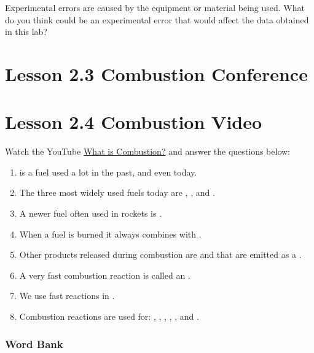 \documentclass[answers,12pt]{exam}
\begin{document}
\begin{questions}
    \question Experimental errors are caused by the equipment or material being used.  What do you think could be an experimental error that would affect the data obtained in this lab?

    \vspace{2cm}
\end{questions}

\newpage

\section*{Lesson 2.3 Combustion Conference}

\newpage

\section*{Lesson 2.4 Combustion Video}

Watch the YouTube \href{https://www.youtube.com/watch?v=xd1alir07q4}{What is Combustion?} and answer the questions below:


\begin{enumerate}
    \item  \fillin[wood] is a fuel used a lot in the past, and even today.
    \item  The three most widely used fuels today are \fillin[coal], \fillin[oil], and .
    \item  A newer fuel often used in rockets is \fillin[hydrogen].
    \item  When a fuel is burned it always combines with \fillin[oxygen].
    \item  Other products released during combustion are  and \fillin[water] that are emitted as a \fillin[gas].
    \item  A very fast combustion reaction is called an \fillin[explosion].
    \item  We use fast reactions in .
    \item  Combustion reactions are used for:  \fillin[cooking], \fillin[manufacturing], , , , and \fillin[heating].
\end{enumerate}

\subsubsection*{Word Bank}
\end{document}

